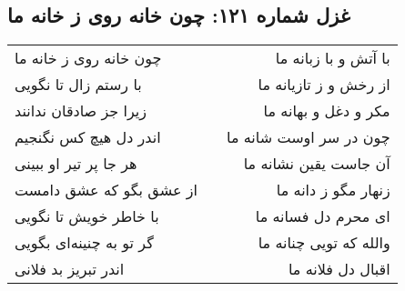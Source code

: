 \begin{center}
\section*{غزل شماره ۱۲۱: چون خانه روی ز خانه ما}
\label{sec:0121}
\begin{longtable}{l p{0.5cm} r}
چون خانه روی ز خانه ما
&&
با آتش و با زبانه ما
\\
با رستم زال تا نگویی
&&
از رخش و ز تازیانه ما
\\
زیرا جز صادقان ندانند
&&
مکر و دغل و بهانه ما
\\
اندر دل هیچ کس نگنجیم
&&
چون در سر اوست شانه ما
\\
هر جا پر تیر او ببینی
&&
آن جاست یقین نشانه ما
\\
از عشق بگو که عشق دامست
&&
زنهار مگو ز دانه ما
\\
با خاطر خویش تا نگویی
&&
ای محرم دل فسانه ما
\\
گر تو به چنینه‌ای بگویی
&&
والله که تویی چنانه ما
\\
اندر تبریز بد فلانی
&&
اقبال دل فلانه ما
\\
\end{longtable}
\end{center}
